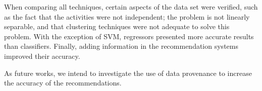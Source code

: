 \documentclass[10pt,letterpaper]{article}
\begin{document}
When comparing all techniques, certain aspects of the data set were verified, such as the fact that the activities were not independent; the problem is not linearly separable, and that clustering techniques were not adequate to solve this problem. With the exception of SVM, regressors presented more accurate results than classifiers. Finally, adding information in the recommendation systems improved their accuracy.

As future works, we intend to investigate the use of data provenance to increase the accuracy of the recommendations.





\end{document}
